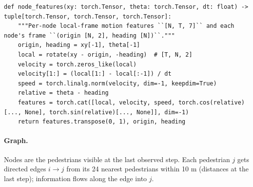 \documentclass[10pt]{article}
\begin{document}
\par\smallskip{}\par\nopagebreak
\begin{lstlisting}[aboveskip=2pt]
def node_features(xy: torch.Tensor, theta: torch.Tensor, dt: float) -> tuple[torch.Tensor, torch.Tensor, torch.Tensor]:
    """Per-node local-frame motion features ``[N, T, 7]`` and each node's frame ``(origin [N, 2], heading [N])``."""
    origin, heading = xy[-1], theta[-1]
    local = rotate(xy - origin, -heading)  # [T, N, 2]
    velocity = torch.zeros_like(local)
    velocity[1:] = (local[1:] - local[:-1]) / dt
    speed = torch.linalg.norm(velocity, dim=-1, keepdim=True)
    relative = theta - heading
    features = torch.cat([local, velocity, speed, torch.cos(relative)[..., None], torch.sin(relative)[..., None]], dim=-1)
    return features.transpose(0, 1), origin, heading

\end{lstlisting}

\paragraph{Graph.} Nodes are the pedestrians visible at the last observed step. Each pedestrian $j$ gets
directed edges $i\to j$ from its 24 nearest pedestrians within 10 m (distances at the last step); information
flows along the edge into $j$.
\end{document}
